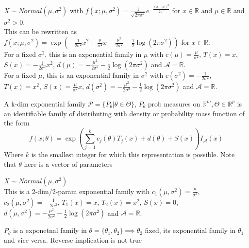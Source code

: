 \documentclass[answers,12pt,addpoints]{exam}
\begin{document}
\begin{example}
    $X \sim Normal(\mu,\sigma^2)$ with $f(x;\mu,\sigma^2) = \frac{1}{\sqrt{2\pi\sigma^2}} e^{-\frac{(x-\mu)^2}{2\sigma^2}}$ for $x \in \mathbb{R}$ and $\mu \in \mathbb{R}$ and $\sigma^2 > 0$.\\
    This can be rewritten as $f(x;\mu,\sigma^2) = \exp\left( -\frac{1}{2\sigma^2} x^2 + \frac{\mu}{\sigma^2} x - \frac{\mu^2}{2\sigma^2} - \frac{1}{2} \log (2\pi\sigma^2) \right)$ for $x \in \mathbb{R}$.\\
    For a fixed $\sigma^2$, this is an exponential family in $\mu$ with $c(\mu) = \frac{\mu}{\sigma^2}$, $T(x) = x$, $S(x) = -\frac{1}{2\sigma^2} x^2$, $d(\mu) = -\frac{\mu^2}{2\sigma^2} - \frac{1}{2} \log (2\pi\sigma^2)$ and $\mathcal{A} = \mathbb{R}$.\\
    For a fixed $\mu$, this is an exponential family in $\sigma^2$ with $c(\sigma^2) = -\frac{1}{2\sigma^2}$, $T(x) = x^2$, $S(x) = \frac{\mu}{\sigma^2} x$, $d(\sigma^2) = -\frac{\mu^2}{2\sigma^2} - \frac{1}{2} \log (2\pi\sigma^2)$ and $\mathcal{A} = \mathbb{R}$.
\end{example}
\begin{definition}
     A k-dim exponential family $\mathcal{P} = \{P_\theta | \theta \in \Theta\}$, $P_\theta$ prob measures on $\mathbb{R}^m, \Theta \in \mathbb{R}^p$ is an identifiable family of distributing with density or probability mass function of the form
    $$ f(x; \theta) = \exp\left( \sum_{j=1}^{k} c_j(\theta)T_j(x) + d(\theta) + S(x) \right) I_{\mathcal{A}}(x)$$
    Where $k$ is the smallest integer for which this representation is possible.
    Note that $\theta$ here is a vector of parameters
\end{definition}
\begin{example}
    $X \sim Normal(\mu,\sigma^2)$ \\
    This is a 2-dim/2-param exponential family with $c_1(\mu,\sigma^2) = \frac{\mu}{\sigma^2}$, $c_2(\mu,\sigma^2) = -\frac{1}{2\sigma^2}$, $T_1(x) = x$, $T_2(x) = x^2$, $S(x) = 0$, $d(\mu,\sigma^2) = -\frac{\mu^2}{2\sigma^2} - \frac{1}{2} \log (2\pi\sigma^2)$ and $\mathcal{A} = \mathbb{R}$.
\end{example}
\begin{remark}
    $P_\theta$ is a exponetnal family in $\theta = \{\theta_1, \theta_2\} \implies \theta_2$ fixed, its exponential family in $\theta_1$ and vice versa.
    Reverse implication is not true
\end{remark}
\end{document}
